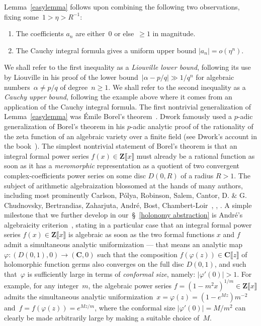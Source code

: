 \documentclass[10pt]{amsart}
\def\SSS{\S}
\def\SSSS{\S}
\def\Z{\mathbf{Z}}
\theoremstyle{remark}
\numberwithin{equation}{subsection}
\def\C{\mathbf{C}}
\begin{document}
Lemma~\ref{easylemma} follows  upon combining the following two observations, fixing some~$1>\eta>R^{-1}$:
\begin{enumerate}
\item
The coefficients $a_n$ are either~$0$ or else~$\geq 1$ in magnitude.
\item 
The Cauchy integral formula gives a uniform upper bound $|a_n| = o(\eta^n)$.
\end{enumerate}
We shall refer to the first inequality as a \emph{Liouville lower bound}, following its use by Liouville in his proof of  the lower bound~$|\alpha - p/q| \gg 1/q^n$ 
for algebraic numbers~$\alpha\neq p/q$ of degree~$n\ge 1$.
We shall refer to the second inequality as a \emph{Cauchy upper bound},
following the example above where it comes from an application of the Cauchy integral formula.
The first nontrivial generalization of Lemma~\ref{easylemma} was
 \'Emile Borel's theorem~\cite{Borel}. Dwork famously used a  $p$-adic generalization of Borel's theorem in his $p$-adic analytic proof of the rationality of the zeta function of an algebraic  variety over a finite field (see Dwork's account in the book~\cite[Chapter~2]{DworkGerottoSullivan}). The simplest nontrivial statement of Borel's theorem is 
 that an integral formal power series $f(x) \in \Z\llbracket x \rrbracket$ must  already be a rational function as soon as it has a \emph{meromorphic}  representation as a quotient of two convergent complex-coefficients power series on some disc $D(0,R)$ of a radius $R > 1$.  
 The subject of arithmetic algebraization blossomed at the hands of many authors, including most prominently Carlson, P\'olya, Robinson, Salem, Cantor, D. $\&$ G. Chudnovsky, 
 Bertrandias, Zaharjuta, Andr\'e, Bost, Chambert-Loir~\cite{ACL,BCL,Amice}, \cite[\SSS~I.5]{Andre}, \cite[\SSS~VIII]{AndreG}. A simple milestone that we further develop in our~\SSSS~\ref{holonomy abstraction} is Andr\'e's algebraicity criterion~\cite[Th\'eor\`eme~5.4.3]{Andre}, stating in a particular case that an integral formal power series $f(x) \in \Z\llbracket x \rrbracket$ is algebraic as soon as the two formal functions $x$ and $f$ admit a simultaneous analytic uniformization --- that means an analytic map $\varphi : (D(0,1),0) \to (\C,0)$ such that the 
 composition
 $f(\varphi(z)) \in \C\llbracket z \rrbracket$ of holomorphic function germs
also converges on the full disc $D(0,1)$, and such that~$\varphi$ is sufficiently large in terms of  \emph{conformal size}, namely: $|\varphi'(0)| > 1$.  For example, for any integer~$m$, the algebraic power series $f = (1 - m^2 x)^{1/m} \in \Z\llbracket x \rrbracket$ admits the simultaneous analytic uniformization~$x = \varphi(z) =   (1-e^{Mz}) m^{-2}$ and~$f = f(\varphi(z)) = e^{Mz/m}$, where the conformal size $|\varphi'(0)| = M/m^2$ can clearly be made
arbitrarily large by making a suitable choice of~$M$.
\end{document}
